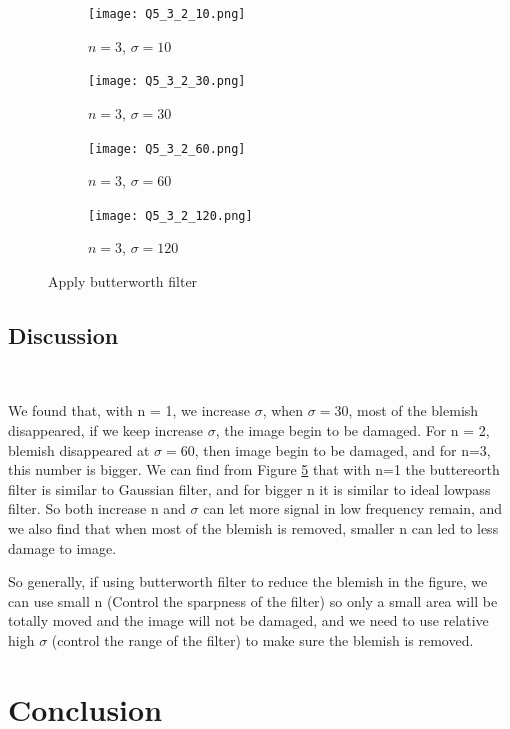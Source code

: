 \documentclass[
	12pt, %
]{style/fphw}
\begin{document}
\begin{figure}[H]
\begin{subfigure}[b]{.22\textwidth}
             \centering
             \texttt{[image: Q5\_3\_2\_10.png]}
             \caption{$n=3$, $\sigma=10$}
             \label{Q5_3_3_10}
         \end{subfigure}
         \hfill
         \begin{subfigure}[b]{.22\textwidth}
             \centering
             \texttt{[image: Q5\_3\_2\_30.png]}
             \caption{$n=3$, $\sigma=30$}
             \label{Q5_3_3_30}
         \end{subfigure}
         \hfill
         \begin{subfigure}[b]{.22\textwidth}
             \centering
             \texttt{[image: Q5\_3\_2\_60.png]}
             \caption{$n=3$, $\sigma=60$}
             \label{Q5_3_3_60.tif}
         \end{subfigure}
         \hfill
         \begin{subfigure}[b]{.22\textwidth}
             \centering
             \texttt{[image: Q5\_3\_2\_120.png]}
             \caption{$n=3$, $\sigma=120$}
             \label{Q5_3_3_120.tif}
         \end{subfigure}
     \caption{Apply butterworth filter}
     \label{Butterworth filter}
\end{figure}

\subsection*{Discussion} \

We found that, with n = 1, we increase $\sigma$, when $\sigma=30$, most of the blemish disappeared, if we keep increase $\sigma$, the image begin to be damaged. For n = 2, blemish disappeared at $\sigma=60$, then image begin to be damaged, and for n=3, this number is bigger. We can find from Figure \ref{Butterworth filter} that with n=1 the buttereorth filter is similar to Gaussian filter, and for bigger n it is similar to ideal lowpass filter. So both increase n and $\sigma$ can let more signal in low frequency remain, and we also find that when most of the blemish is removed, smaller n can led to less damage to image.

So generally, if using butterworth filter to reduce the blemish in the figure, we can use small n (Control the sparpness of the filter) so only a small area will be totally moved and the image will not be damaged, and we need to use relative high $\sigma$ (control the range of the filter) to make sure the blemish is removed.

\section*{Conclusion}
\end{document}
